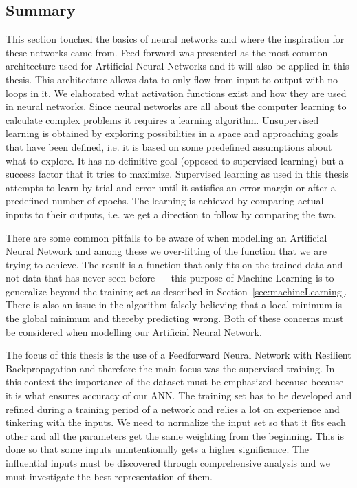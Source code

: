 \subsection{Summary}
This section touched the basics of neural networks and where the inspiration for these networks came from. Feed-forward was presented as the most common architecture used for Artificial Neural Networks and it will also be applied in this thesis. This architecture allows data to only flow from input to output with no loops in it. We elaborated what activation functions exist and how they are used in neural networks. Since neural networks are all about the computer learning to calculate complex problems it requires a learning algorithm. Unsupervised learning is obtained by exploring possibilities in a space and approaching goals that have been defined, i.e. it is based on some predefined assumptions about what to explore. It has no definitive goal (opposed to supervised learning) but a success factor that it tries to maximize. Supervised learning as used in this thesis attempts to learn by trial and error until it satisfies an error margin or after a predefined number of epochs. The learning is achieved by comparing actual inputs to their outputs, i.e. we get a direction to follow by comparing the two.

There are some common pitfalls to be aware of when modelling an Artificial Neural Network and among these we over-fitting of the function that we are trying to achieve. The result is a function that only fits on the trained data and not data that has never seen before --- this purpose of Machine Learning is to generalize beyond the training set as described in Section~\ref{sec:machineLearning}. There is also an issue in the algorithm falsely believing that a local minimum is the global minimum and thereby predicting wrong. Both of these concerns must be considered when modelling our Artificial Neural Network.

The focus of this thesis is the use of a Feedforward Neural Network with Resilient Backpropagation and therefore the main focus was the supervised training. In this context the importance of the dataset must be emphasized because because it is what ensures accuracy of our ANN. The training set has to be developed and refined during a training period of a network and relies a lot on experience and tinkering with the inputs. We need to normalize the input set so that it fits each other and all the parameters get the same weighting from the beginning. This is done so that some inputs unintentionally gets a higher significance. The influential inputs must be discovered through comprehensive analysis and we must investigate the best representation of them.